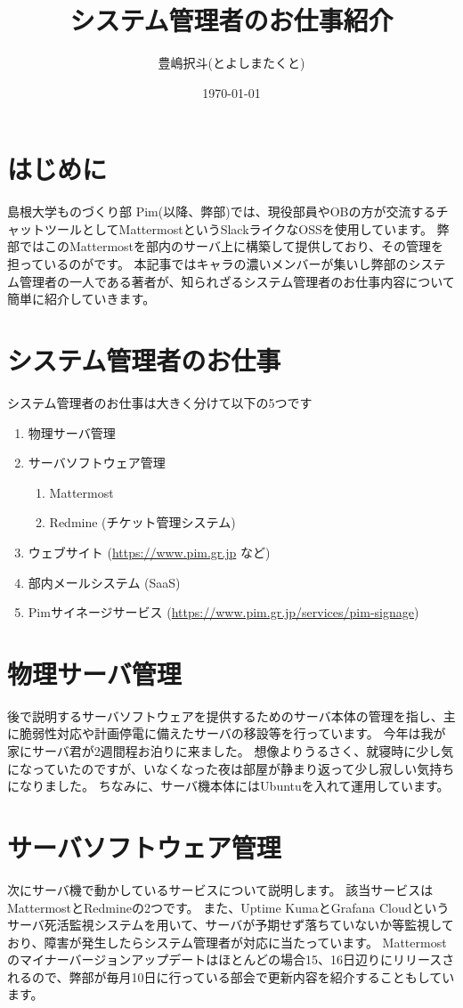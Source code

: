 \documentclass[a4paper,11pt]{jsarticle}
\begin{document}
\title{システム管理者のお仕事紹介}
\author{豊嶋択斗(とよしまたくと)}
\date{\today}
\maketitle

\section{はじめに}
島根大学ものづくり部 Pim(以降、弊部)では、現役部員やOBの方が交流するチャットツールとしてMattermostというSlackライクなOSSを使用しています。
弊部ではこのMattermostを部内のサーバ上に構築して提供しており、その管理を担っているのがです。
本記事ではキャラの濃いメンバーが集いし弊部のシステム管理者の一人である著者が、知られざるシステム管理者のお仕事内容について簡単に紹介していきます。

\section{システム管理者のお仕事}
システム管理者のお仕事は大きく分けて以下の5つです
\begin{enumerate}
  \item 物理サーバ管理
  \item サーバソフトウェア管理
    \begin{enumerate}
      \item Mattermost
      \item Redmine (チケット管理システム)
    \end{enumerate}
  \item ウェブサイト (\url{https://www.pim.gr.jp} など)
  \item 部内メールシステム (SaaS)
  \item Pimサイネージサービス (\url{https://www.pim.gr.jp/services/pim-signage})
\end{enumerate}

\section{物理サーバ管理}
後で説明するサーバソフトウェアを提供するためのサーバ本体の管理を指し、主に脆弱性対応や計画停電に備えたサーバの移設等を行っています。
今年は我が家にサーバ君が2週間程お泊りに来ました。
想像よりうるさく、就寝時に少し気になっていたのですが、いなくなった夜は部屋が静まり返って少し寂しい気持ちになりました。
ちなみに、サーバ機本体にはUbuntuを入れて運用しています。

\section{サーバソフトウェア管理}
次にサーバ機で動かしているサービスについて説明します。
該当サービスはMattermostとRedmineの2つです。
また、Uptime KumaとGrafana Cloudというサーバ死活監視システムを用いて、サーバが予期せず落ちていないか等監視しており、障害が発生したらシステム管理者が対応に当たっています。
Mattermostのマイナーバージョンアップデートはほとんどの場合15、16日辺りにリリースされるので、弊部が毎月10日に行っている部会で更新内容を紹介することもしています。
\end{document}
